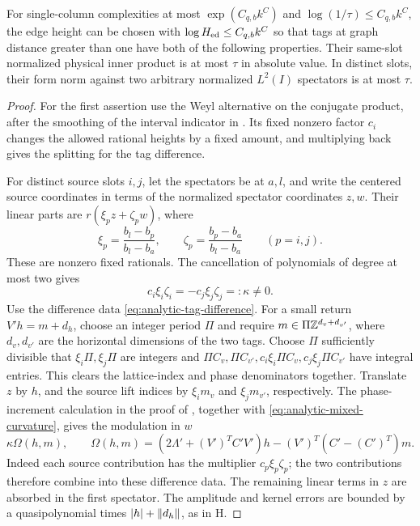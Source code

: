 \begin{lemma}\label{lem:tag-separation}
For single-column complexities at most \(\exp(C_{q,b}k^C)\) and
\(\log(1/\tau)\le C_{q,b}k^C\), the edge height can be chosen with
\(\log H_{\rm ed}\le C_{q,b}k^C\) so that tags at graph distance
greater than one have both of the following properties.  Their
same-slot normalized physical inner product is at most \(\tau\)
in absolute value.  In distinct slots, their form norm against two
arbitrary normalized \(L^2(I)\) spectators is at most \(\tau\).
\end{lemma}
\begin{proof}
For the first assertion use the Weyl alternative on the conjugate
product, after the smoothing of the interval indicator in
\cite[Lemma~6.1]{H}.  Its fixed nonzero factor \(c_i\) changes
the allowed rational heights by a fixed amount, and multiplying
back gives the splitting for the tag difference.

For distinct source slots \(i,j\), let the spectators be at
\(a,l\), and write the centered source coordinates in terms of
the normalized spectator coordinates \(z,w\).  Their linear
parts are \(r(\xi_pz+\zeta_pw)\), where
\[
 \xi_p=\frac{b_l-b_p}{b_l-b_a},\qquad
 \zeta_p=\frac{b_p-b_a}{b_l-b_a}\qquad(p=i,j).
\]
These are nonzero fixed rationals.  The cancellation of polynomials
of degree at most two gives
\begin{equation}
 c_i\xi_i\zeta_i=-c_j\xi_j\zeta_j=:\kappa\ne0.
 \label{eq:analytic-mixed-curvature}
\end{equation}
Use the difference data \eqref{eq:analytic-tag-difference}.  For
a small return \(V'h=m+d_h\), choose an integer period \(\Pi\)
and require \(m\in\Pi\mathbb Z^{d_v+d_{v'}}\), where \(d_v,d_{v'}\)
are the horizontal dimensions of the two tags.  Choose \(\Pi\)
sufficiently divisible that \(\xi_i\Pi,\xi_j\Pi\) are integers and
\(\Pi C_v,\Pi C_{v'},c_i\xi_i\Pi C_v,c_j\xi_j\Pi C_{v'}\)
have integral entries.
This clears the lattice-index and phase denominators together.
Translate \(z\) by \(h\), and the source lift indices by
\(\xi_im_v\) and \(\xi_jm_{v'}\), respectively.  The phase-increment
calculation in the proof of \cite[Lemma~4.3]{H}, together with
\eqref{eq:analytic-mixed-curvature}, gives the modulation in \(w\)
\[
 \kappa\Omega(h,m),\qquad
 \Omega(h,m)=(2\Lambda'+(V')^TC'V')h
                      -(V')^T(C'-(C')^T)m.
\]
Indeed each source contribution has the multiplier
\(c_p\xi_p\zeta_p\); the two contributions therefore combine
into these difference data.  The remaining linear terms in \(z\)
are absorbed in the first spectator.  The amplitude and kernel
errors are bounded by a quasipolynomial times
\(|h|+\lVert d_h\rVert\), as in H.


\end{proof}
